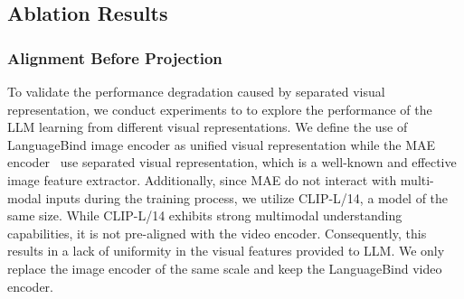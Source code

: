 \subsection{Ablation Results}

\subsubsection{Alignment Before Projection} To validate the performance degradation caused by separated visual representation, we conduct experiments to to explore the performance of the LLM learning from different visual representations. We define the use of LanguageBind image encoder as unified visual representation while the MAE encoder~\cite{he2022masked} use separated visual representation, which is a well-known and effective image feature extractor. Additionally, since MAE do not interact with multi-modal inputs during the training process, we utilize CLIP-L/14, a model of the same size. While CLIP-L/14 exhibits strong multimodal understanding capabilities, it is not pre-aligned with the video encoder. Consequently, this results in a lack of uniformity in the visual features provided to LLM. We only replace the image encoder of the same scale and keep the LanguageBind video encoder. 

